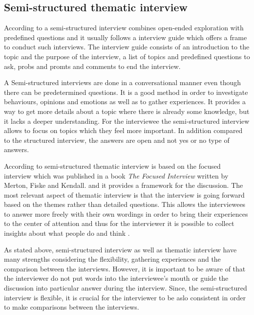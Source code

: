 \subsection{Semi-structured thematic interview}

According to \textcite{Wilson:2013} a semi-structured interview combines open-ended exploration with predefined questions and it usually follows a interview guide which offers a frame to conduct such interviews. The interview guide consists of an introduction to the topic and the purpose of the interview, a list of topics and predefined questions to ask, probs and promts and comments to end the interview.

A Semi-structured interviews are done in a conversational manner even though there can be predetermined questions. It is a good method in order to investigate behaviours, opinions and emotions as well as to gather experiences. It provides a way to get more details about a topic where there is already some knowledge, but it lacks a deeper understanding. For the interviewee the semi-structured interview allows to focus on topics which they feel more important. In addition compared to the structured interview, the answers are open and not yes or no type of answers. \parencite{Cliffod:2010,Wilson:2013}

According to \textcite{HH:2001} semi-structured thematic interview is based on the focused interview which was published in a book \emph{The Focused Interview} written by Merton, Fiske and Kendall. and it provides a framework for the discussion. The most relevant aspect of thematic interview is that the interview is going forward based on the themes rather than detailed questions. This allows the interviewees to answer more freely with their own wordings in order to bring their experiences to the center of attention and thus for the interviewer it is possible to collect insights about what people do and think \parencite{Cliffod:2010}.

As stated above, semi-structured interview as well as thematic interview have many strengths considering the flexibility, gathering experiences and the comparison between the interviews. However, it is important to be aware of that the interviewer do not put words into the interviewee's mouth or guide the discussion into particular answer during the interview. Since, the semi-structured interview is flexible, it is crucial for the interviewer to be aslo consistent in order to make comparisons between the interviews. \parencite{Wilson:2013}

